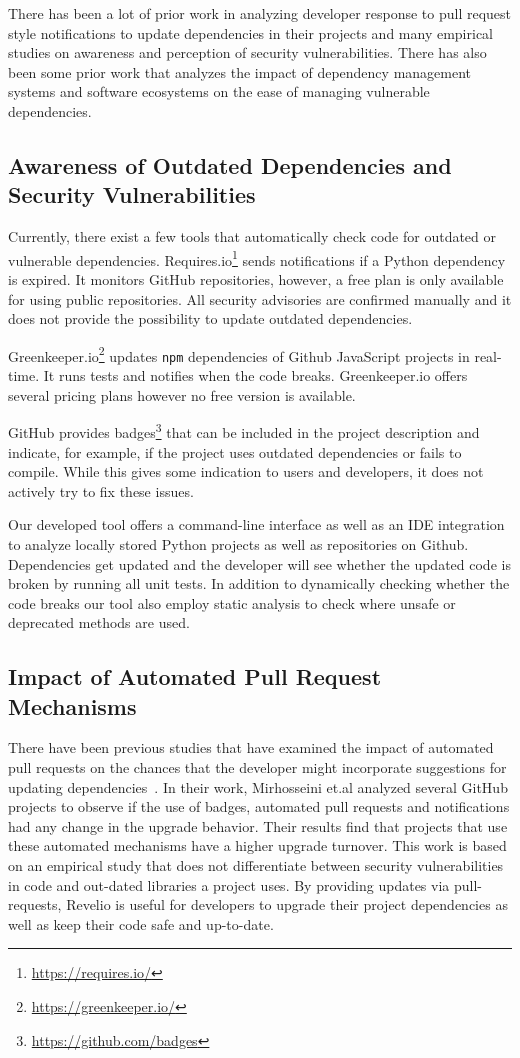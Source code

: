 There has been a lot of prior work in analyzing developer response to pull request style notifications to update dependencies in their projects and many empirical studies on awareness and perception of security vulnerabilities. There has also been some prior work that analyzes the impact of dependency management systems and software ecosystems on the ease of managing vulnerable dependencies. 

\subsection{Awareness of Outdated Dependencies and Security Vulnerabilities}

Currently, there exist a few tools that automatically check code for outdated or vulnerable dependencies.
Requires.io\footnote{\url{https://requires.io/}} sends notifications if a Python dependency is expired. It monitors GitHub repositories, however, a free plan is only available for using public repositories. All security advisories are confirmed manually and it does not provide the possibility to update outdated dependencies.

Greenkeeper.io\footnote{\url{https://greenkeeper.io/}} updates \texttt{npm} dependencies of Github JavaScript projects in real-time. It runs tests and notifies when the code breaks. Greenkeeper.io offers several pricing plans however no free version is available.

GitHub provides badges\footnote{\url{https://github.com/badges}} that can be included in the project description and indicate, for example, if the project uses outdated dependencies or fails to compile. While this gives some indication to users and developers, it does not actively try to fix these issues.

Our developed tool offers a command-line interface as well as an IDE integration to analyze locally stored Python projects as well as repositories on Github. Dependencies get updated and the developer will see whether the updated code is broken by running all unit tests. In addition to dynamically checking whether the code breaks our tool also employ static analysis to check where unsafe or deprecated methods are used.

\subsection{Impact of Automated Pull Request Mechanisms}

There have been previous studies that have examined the impact of automated pull requests on the chances that the developer might incorporate suggestions for updating dependencies~\cite{Mirhosseini:2017}. In their work, Mirhosseini et.al analyzed several GitHub projects to observe if the use of badges, automated pull requests and notifications had any change in the upgrade behavior. Their results find that projects that use these automated mechanisms have a higher upgrade turnover. This work is based on an empirical study that does not differentiate between security vulnerabilities in code and out-dated libraries a project uses. 
By providing updates via pull-requests, Revelio is useful for developers to upgrade their project dependencies as well as keep their code safe and up-to-date.

